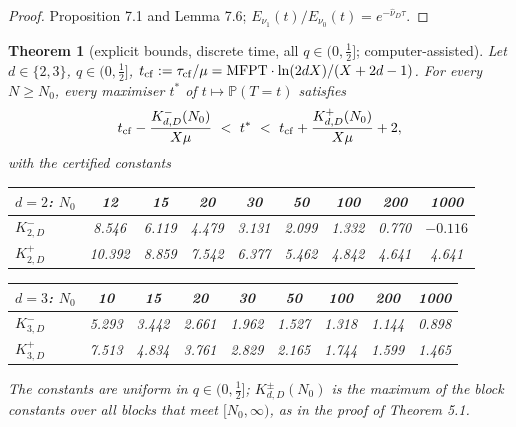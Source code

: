 \documentclass[11pt,a4paper]{article}
\newtheorem{theorem}{Theorem}[section]
\theoremstyle{definition}
\theoremstyle{remark}
\begin{document}
\begin{proof}
Proposition 7.1 and Lemma 7.6; $E_{\nu_1}(t)/E_{\nu_0}(t)=e^{-\hat\nu_D\tau}$.
\end{proof}

\begin{theorem}[{explicit bounds, discrete time, all $q\in(0,\frac12]$; computer-assisted}]
Let $d\in\{2,3\}$, $q\in(0,\frac12]$, $t_{\rm cf}:=\tau_{\rm cf}/\mu={\rm MFPT}\cdot\ln(2dX)/(X+2d-1)$. For every $N\ge N_0$, every maximiser $t^*$ of $t\mapsto\mathbb P(T=t)$ satisfies
\begin{equation*}
t_{\rm cf}-\frac{K^-_{d,D}(N_0)}{X\mu}\ <\ t^*\ <\ t_{\rm cf}+\frac{K^+_{d,D}(N_0)}{X\mu}+2,
\end{equation*}
with the certified constants

\begin{center}\small
\begin{tabular}{lcccccccc}
\toprule
$d=2$: $N_0$ & 12 & 15 & 20 & 30 & 50 & 100 & 200 & 1000 \\ \midrule
$K^-_{2,D}$ & 8.546 & 6.119 & 4.479 & 3.131 & 2.099 & 1.332 & 0.770 & $-0.116$ \\
$K^+_{2,D}$ & 10.392 & 8.859 & 7.542 & 6.377 & 5.462 & 4.842 & 4.641 & 4.641 \\
\bottomrule
\end{tabular}
\end{center}

\begin{center}\small
\begin{tabular}{lcccccccc}
\toprule
$d=3$: $N_0$ & 10 & 15 & 20 & 30 & 50 & 100 & 200 & 1000 \\ \midrule
$K^-_{3,D}$ & 5.293 & 3.442 & 2.661 & 1.962 & 1.527 & 1.318 & 1.144 & 0.898 \\
$K^+_{3,D}$ & 7.513 & 4.834 & 3.761 & 2.829 & 2.165 & 1.744 & 1.599 & 1.465 \\
\bottomrule
\end{tabular}
\end{center}

The constants are uniform in $q\in(0,\frac12]$; $K^\pm_{d,D}(N_0)$ is the maximum of the block constants over all blocks that meet $[N_0,\infty)$, as in the proof of Theorem 5.1.
\end{theorem}
\end{document}

